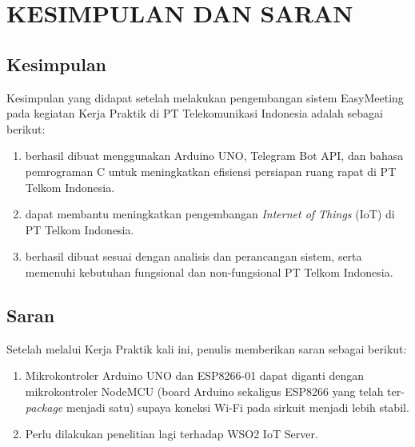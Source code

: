 \chapter{KESIMPULAN DAN SARAN}

\section{Kesimpulan}
\tab Kesimpulan yang didapat setelah melakukan pengembangan sistem EasyMeeting pada kegiatan Kerja Praktik di PT Telekomunikasi Indonesia adalah sebagai berikut:
\begin{enumerate}
\item \sistem berhasil dibuat menggunakan Arduino UNO, Telegram Bot API, dan bahasa pemrograman C untuk meningkatkan efisiensi persiapan ruang rapat di PT Telkom Indonesia.
\item \sistem dapat membantu meningkatkan pengembangan \textit{Internet of Things} (IoT) di PT Telkom Indonesia.
\item \sistem berhasil dibuat sesuai dengan analisis dan perancangan sistem, serta memenuhi kebutuhan fungsional dan non-fungsional PT Telkom Indonesia.
\end{enumerate}

\section{Saran}
Setelah melalui Kerja Praktik kali ini, penulis memberikan saran sebagai berikut:
\begin{enumerate}
\item Mikrokontroler Arduino UNO dan ESP8266-01 dapat diganti dengan mikrokontroler NodeMCU (board Arduino sekaligus ESP8266 yang telah ter-\textit{package} menjadi satu) supaya koneksi Wi-Fi pada sirkuit menjadi lebih stabil.
\item Perlu dilakukan penelitian lagi terhadap WSO2 IoT Server.
\end{enumerate}